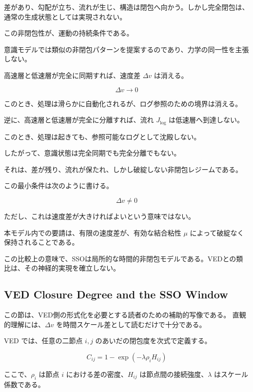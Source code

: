差があり、勾配が立ち、流れが生じ、構造は閉包へ向かう。しかし完全閉包は、通常の生成状態としては実現されない。

この非閉包性が、運動の持続条件である。

意識モデルでは類似の非閉包パターンを提案するのであり、力学の同一性を主張しない。

高速層と低速層が完全に同期すれば、速度差 $\Delta v$ は消える。

\begin{equation}
\Delta v \rightarrow 0
\end{equation}

このとき、処理は滑らかに自動化されるが、ログ参照のための境界は消える。

逆に、高速層と低速層が完全に分離すれば、流れ $J_{\log}$ は低速層へ到達しない。

このとき、処理は起きても、参照可能なログとして沈殿しない。

したがって、意識状態は完全同期でも完全分離でもない。

それは、差が残り、流れが保たれ、しかし破綻しない非閉包レジームである。

この最小条件は次のように書ける。

\begin{equation}
\Delta v \neq 0
\end{equation}

ただし、これは速度差が大きければよいという意味ではない。

本モデル内での要請は、有限の速度差が、有効な結合粘性 $\mu$ によって破綻なく保持されることである。

この比較上の意味で、SSOは局所的な時間的非閉包モデルである。VEDとの類比は、その神経的実現を確立しない。

\subsection{VED Closure Degree and the SSO Window}

この節は、VED側の形式化を必要とする読者のための補助的写像である。
直観的理解には、$\Delta v$ を時間スケール差として読むだけで十分である。

VED では、任意の二節点 $i, j$ のあいだの閉包度を次式で定義する。

\begin{equation}
C_{ij} = 1 - \exp\!\left(-\lambda \rho_i H_{ij}\right)
\end{equation}

ここで、$\rho_i$ は節点 $i$ における差の密度、$H_{ij}$ は節点間の接続強度、$\lambda$ はスケール係数である。

